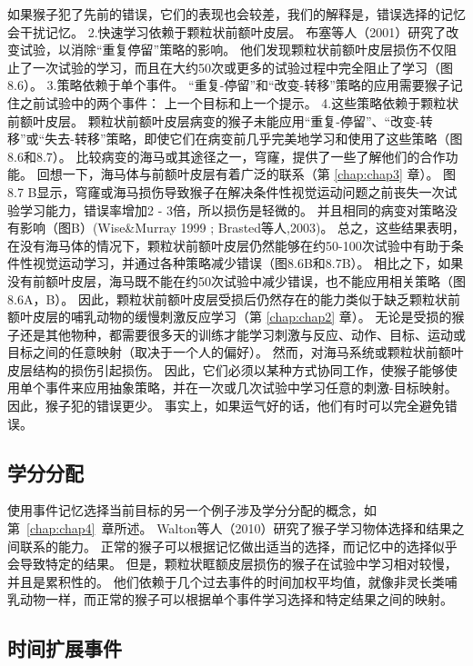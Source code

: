 如果猴子犯了先前的错误，它们的表现也会较差，我们的解释是，错误选择的记忆会干扰记忆。
2.快速学习依赖于颗粒状前额叶皮层。
布塞等人（2001）研究了改变试验，以消除“重复停留”策略的影响。
他们发现颗粒状前额叶皮层损伤不仅阻止了一次试验的学习，而且在大约50次或更多的试验过程中完全阻止了学习（图8.6）。
3.策略依赖于单个事件。
“重复-停留”和“改变-转移”策略的应用需要猴子记住之前试验中的两个事件：
上一个目标和上一个提示。
4.这些策略依赖于颗粒状前额叶皮层。
颗粒状前额叶皮层病变的猴子未能应用“重复-停留”、“改变-转移”或“失去-转移”策略，即使它们在病变前几乎完美地学习和使用了这些策略（图8.6和8.7）。
比较病变的海马或其途径之一，穹窿，提供了一些了解他们的合作功能。
回想一下，海马体与前额叶皮层有着广泛的联系（第 \ref{chap:chap3} 章）。
图8.7 B显示，穹窿或海马损伤导致猴子在解决条件性视觉运动问题之前丧失一次试验学习能力，错误率增加2 - 3倍，所以损伤是轻微的。
并且相同的病变对策略没有影响（图B）(Wise\&Murray 1999 ; Brasted等人,2003)。
总之，这些结果表明，在没有海马体的情况下，颗粒状前额叶皮层仍然能够在约50-100次试验中有助于条件性视觉运动学习，并通过各种策略减少错误（图8.6B和8.7B）。
相比之下，如果没有前额叶皮层，海马既不能在约50次试验中减少错误，也不能应用相关策略（图8.6A，B）。
因此，颗粒状前额叶皮层受损后仍然存在的能力类似于缺乏颗粒状前额叶皮层的哺乳动物的缓慢刺激反应学习（第 \ref{chap:chap2} 章）。
无论是受损的猴子还是其他物种，都需要很多天的训练才能学习刺激与反应、动作、目标、运动或目标之间的任意映射（取决于一个人的偏好）。
然而，对海马系统或颗粒状前额叶皮层结构的损伤引起损伤。
因此，它们必须以某种方式协同工作，使猴子能够使用单个事件来应用抽象策略，并在一次或几次试验中学习任意的刺激-目标映射。
因此，猴子犯的错误更少。
事实上，如果运气好的话，他们有时可以完全避免错误。



\subsection{学分分配}

使用事件记忆选择当前目标的另一个例子涉及学分分配的概念，如第~\ref{chap:chap4}~章所述。
Walton等人（2010）研究了猴子学习物体选择和结果之间联系的能力。
正常的猴子可以根据记忆做出适当的选择，而记忆中的选择似乎会导致特定的结果。
但是，颗粒状眶额皮层损伤的猴子在试验中学习相对较慢，并且是累积性的。
他们依赖于几个过去事件的时间加权平均值，就像非灵长类哺乳动物一样，而正常的猴子可以根据单个事件学习选择和特定结果之间的映射。



\subsection{时间扩展事件}

